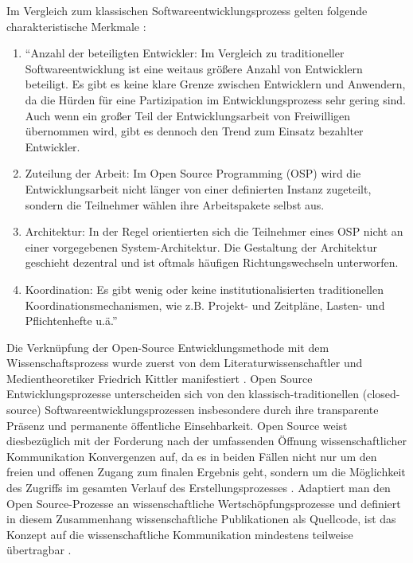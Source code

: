 Im Vergleich zum klassischen Softwareentwicklungsprozess gelten folgende charakteristische Merkmale \cite{suchen}:
\begin{enumerate}
\item “Anzahl der beteiligten Entwickler: Im Vergleich zu traditioneller Softwareentwicklung ist eine weitaus größere Anzahl von Entwicklern beteiligt. Es gibt es keine klare Grenze zwischen Entwicklern und Anwendern, da die Hürden für eine Partizipation im Entwicklungsprozess sehr gering sind. Auch wenn ein großer Teil der Entwicklungsarbeit von Freiwilligen übernommen wird, gibt es dennoch den Trend zum Einsatz bezahlter Entwickler.
\item Zuteilung der Arbeit: Im Open Source Programming (OSP) wird die Entwicklungsarbeit nicht länger von einer definierten Instanz zugeteilt, sondern die Teilnehmer wählen ihre Arbeitspakete selbst aus.
\item Architektur: In der Regel orientierten sich die Teilnehmer eines OSP nicht an einer vorgegebenen System-Architektur. Die Gestaltung der Architektur geschieht dezentral und ist oftmals häufigen Richtungswechseln unterworfen.
\item Koordination: Es gibt wenig oder keine institutionalisierten traditionellen Koordinationsmechanismen, wie z.B. Projekt- und Zeitpläne, Lasten- und Pflichtenhefte u.ä.” \cite{suchen}
\end{enumerate}

Die Verknüpfung der Open-Source Entwicklungsmethode mit dem Wissenschaftsprozess wurde zuerst von dem Literaturwissenschaftler und Medientheoretiker Friedrich Kittler manifestiert \cite{cite:1}. Open Source Entwicklungsprozesse unterscheiden sich von den klassisch-traditionellen (closed-source) Softwareentwicklungsprozessen insbesondere durch ihre transparente Präsenz und permanente öffentliche Einsehbarkeit. Open Source weist diesbezüglich mit der Forderung nach der umfassenden Öffnung wissenschaftlicher Kommunikation Konvergenzen auf, da es in beiden Fällen nicht nur um den freien und offenen Zugang zum finalen Ergebnis geht, sondern um die Möglichkeit des Zugriffs im gesamten Verlauf des Erstellungsprozesses \cite{kelty_2004_pruefen!}. Adaptiert man den Open Source-Prozesse an wissenschaftliche Wertschöpfungsprozesse und definiert in diesem Zusammenhang wissenschaftliche Publikationen als Quellcode, ist das Konzept auf die wissenschaftliche Kommunikation mindestens teilweise übertragbar \cite{Singh_2008} \cite{Bradley_2008} \cite{dorschel_2006_open} \cite{Bradley_2007} \cite{Willinsky_2005}.

